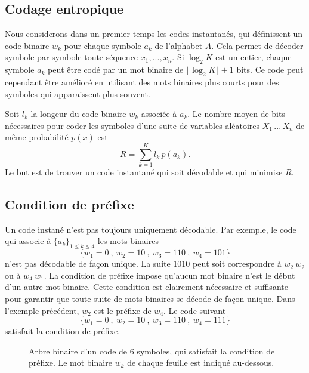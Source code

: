 \subsection{Codage entropique}
\label{entropy-code-sec}

Nous considerons dans un premier temps
les codes instantan\'es, qui d\'efinissent un code binaire
$w_k$ pour chaque symbole $a_k$ de l'alphabet $A$. Cela
permet de d\'ecoder symbole par symbole toute
s\'equence $x_1, ..., x_n$.
Si $\log_2 K$ est un entier, chaque symbole
$a_k$ peut \^etre cod\'e par un mot binaire de
$\lfloor \log_2 K \rfloor + 1$ bits.
Ce code peut cependant \^etre am\'elior\'e
en utilisant des mots
binaires plus courts pour des symboles qui apparaissent plus
souvent.

Soit $l_k$ la longeur du code binaire
$w_k$ associ\'ee \`a $a_k$.
Le nombre moyen de bits n\'ecessaires pour coder les symboles
d'une suite de variables al\'eatoires $X_1 \, ...\, X_n$ de
m\^eme probabilit\'e $p(x)$ est
\begin{equation}
\label{bit-rate}
R  = \sum_{k=1}^{K} l_k\, p(a_k) .
\end{equation}
Le but est de trouver un code instantan\'e qui soit
d\'ecodable et qui minimise $R$.\\

\subsection{Condition de pr\'efixe}
Un code instan\'e n'est pas toujours uniquement d\'ecodable.
Par exemple, le code qui associe \`a
$\{a_k\}_{1 \leq k \leq 4}$
les mots binaires
\[
\{w_1 = 0 ~,~w_2 = 10 ~,~w_3 = 110 ~,~w_4 = 101 \}
\]
n'est pas d\'ecodable de fa\c{c}on unique.
La suite $1010$ peut soit correspondre
\`a $w_2~w_2$ ou \`a $w_4~ w_1$.
La condition de pr\'efixe impose qu'aucun mot binaire n'est le
d\'ebut d'un autre mot binaire.
Cette condition est clairement n\'ecessaire et
suffisante pour garantir que
toute suite de mots binaires se d\'ecode de fa\c con unique.
Dans l'exemple pr\'ec\'edent,
$w_2$ est le pr\'efixe de $w_4$.
Le code suivant
\[
\{w_1 = 0 ~,~w_2 = 10 ~,~w_3 = 110 ~,~w_4 = 111 \}
\]
satisfait la condition de pr\'efixe.


\begin{figure}[bhtp]
\centerline{
        \epsfxsize=5cm
	\leavevmode{}}
\caption{Arbre binaire d'un code de $6$ symboles,
qui satisfait la condition de pr\'efixe. Le mot binaire
$w_k$ de chaque feuille est indiqu\'e au-dessous.}
\label{prefixe6}
\end{figure}

